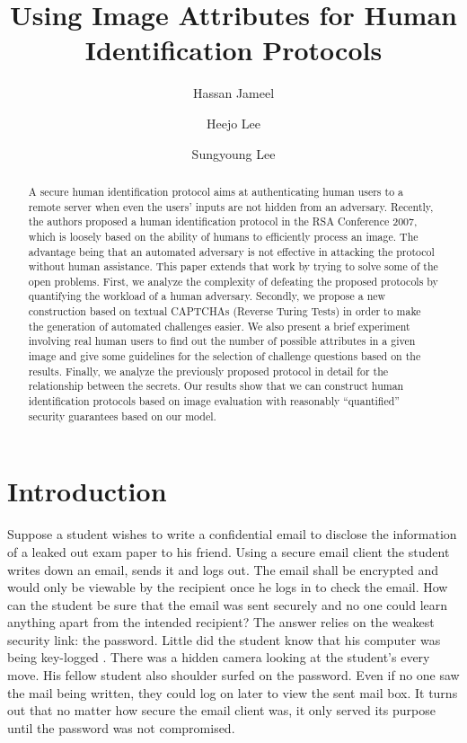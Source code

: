 \documentclass{llncs}
\begin{document}
\title{Using Image Attributes for Human Identification Protocols}
\author{Hassan Jameel \and Heejo Lee \and Sungyoung Lee}




\maketitle
\begin{abstract}
A secure human identification protocol aims at authenticating human users to a remote server when even the users' inputs are not hidden from an adversary. Recently, the authors proposed a human identification protocol in the RSA Conference 2007, which is loosely based on the ability of humans to efficiently process an image. The advantage being that an automated adversary is not effective in attacking the protocol without human assistance. This paper extends that work by trying to solve some of the open problems. First, we analyze the complexity of defeating the proposed protocols by quantifying the workload of a human adversary. Secondly, we propose a new construction based on textual CAPTCHAs (Reverse Turing Tests) in order to make the generation of automated challenges easier. We also present a brief experiment involving real human users to find out the number of possible attributes in a given image and give some guidelines for the selection of challenge questions based on the results. Finally, we analyze the previously proposed protocol in detail for the relationship between the secrets. Our results show that we can construct human identification protocols based on image evaluation with reasonably ``quantified'' security guarantees based on our model.
\end{abstract}
\section{Introduction}
Suppose a student wishes to write a confidential email to disclose the information of a leaked out exam paper to his friend.  Using a secure email client the student writes down an email, sends it and logs out. The email shall be encrypted and would only be viewable by the recipient once he logs in to check the email. How can the student be sure that the email was sent securely and no one could learn anything apart from   the intended recipient? The answer relies on the weakest security link: the password. Little did the student know that his computer was being key-logged \cite{keylog}. There was a hidden camera looking at the student's every move. His fellow student also shoulder surfed on the password. Even if no one saw the mail being written, they could log on later to view the sent mail box. It turns out that no matter how secure the email client was, it only served its purpose until the password was not compromised.
\end{document}
